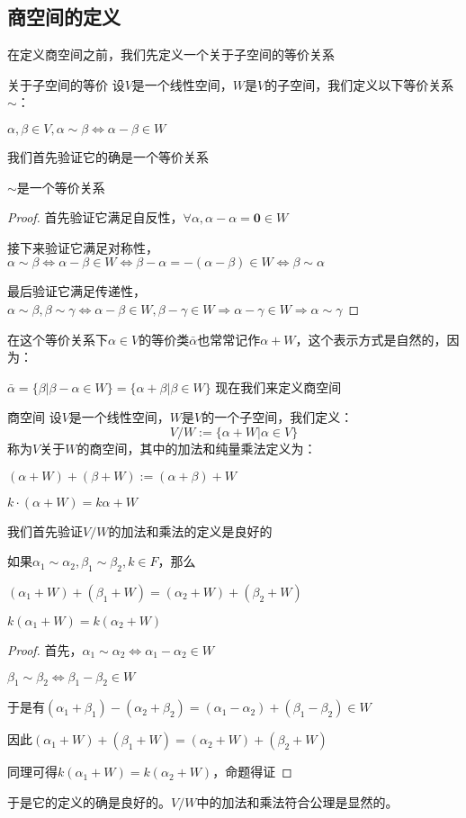 \documentclass[12pt, a4paper, oneside, UTF8]{ctexbook}
\begin{document}
		\subsection{商空间的定义}
			在定义商空间之前，我们先定义一个关于子空间的等价关系
			\begin{defn}{关于子空间的等价}{}
				设$V$是一个线性空间，$W$是$V$的子空间，我们定义以下等价关系$\sim$：

				$\alpha ,\beta \in V,\alpha \sim  \beta \Leftrightarrow \alpha -\beta \in W$
			\end{defn}
			我们首先验证它的确是一个等价关系
			\begin{proposition}
				$\sim$是一个等价关系
			\end{proposition}
			\begin{proof}
				首先验证它满足自反性，$\forall \alpha ,\alpha -\alpha = \mathbf{0} \in W$

				接下来验证它满足对称性，$\alpha \sim \beta \Leftrightarrow \alpha -\beta \in W \Leftrightarrow \beta -\alpha = -(\alpha -\beta) \in W \Leftrightarrow \beta \sim \alpha $
				
				最后验证它满足传递性，$\alpha \sim \beta ,\beta \sim \gamma \Leftrightarrow \alpha -\beta \in W,\beta -\gamma \in W \Rightarrow \alpha -\gamma \in W \Rightarrow \alpha \sim \gamma $
			\end{proof}
			在这个等价关系下$\alpha \in V$的等价类$\bar{\alpha } $也常常记作$\alpha +W$，这个表示方式是自然的，因为：

			$\bar{\alpha }=\{\beta | \beta -\alpha \in W\}=\{\alpha +\beta | \beta \in W\}$
			现在我们来定义商空间
			\begin{defn}{商空间}{}
				设$V$是一个线性空间，$W$是$V$的一个子空间，我们定义：
				\begin{equation}
					V/W := \{\alpha + W|\alpha \in V\}
				\end{equation}
				称为$V$关于$W$的商空间，其中的加法和纯量乘法定义为：

				$(\alpha +W)+(\beta +W):= (\alpha +\beta )+W$

				$k \cdot (\alpha +W)=k\alpha + W$
			\end{defn}
			我们首先验证$V/W$的加法和乘法的定义是良好的
			\begin{proposition}
				如果$\alpha_1 \sim \alpha_2,\beta_1 \sim \beta_2,k \in F$，那么

				$(\alpha_1+W)+(\beta_1+W)=(\alpha_2+W)+(\beta_2+W)$

				$k(\alpha_1 + W)=k(\alpha_2+W)$
			\end{proposition}
			\begin{proof}
				首先，$\alpha_1 \sim \alpha_2 \Leftrightarrow \alpha_1 -\alpha_2 \in W$

				$\beta_1 \sim \beta_2 \Leftrightarrow \beta_1 -\beta_2 \in W$

				于是有$(\alpha_1 +\beta_1) - (\alpha_2 +\beta_2) = (\alpha_1 -\alpha_2)+(\beta_1-\beta_2) \in W$

				因此$(\alpha_1+W)+(\beta_1+W)=(\alpha_2+W)+(\beta_2+W)$

				同理可得$k(\alpha_1 + W)=k(\alpha_2 + W)$，命题得证
			\end{proof}
			于是它的定义的确是良好的。$V/W$中的加法和乘法符合公理是显然的。
\end{document}
